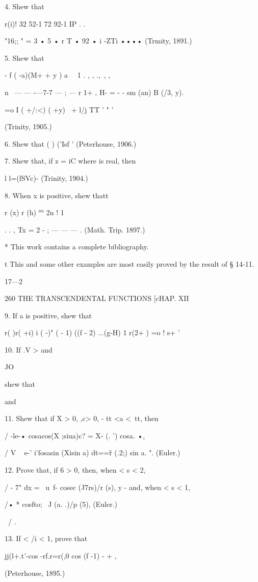 4. Shew that

 r(i)! 32 52-1 72 92-1 IP . .

"16;; " = 3 • 5 • r T • 92 • i -ZTi •••• (Trmity, 1891.)

5. Shew that

- f ( -a)(M+ + y ) a \ \ 1 . , , .,\ , ,

n \ — — -—7-7 — ; — r 1+ , H- = - - sm (an) B (/3, y).

 =o I ( +/:<) ( +y) \ + l/j TT ' " '

(Trinity, 1905.)

6. Shew that ( ) ('Isf ' (Peterhouse, 1906.)

7. Shew that, if z = iC where is real, then

l l=\/(fSVc)- (Trinity, 1904.)

8. When x is positive, shew thatt

r (x) r (h) °° 2n ! 1

 . . , Tx = 2 - ; — — — . (Math. Trip. 1897.)

* This work contains a complete bibliography.

t This and some other examples are most easily proved by the result of
§ 14-11.

17—2



260 THE TRANSCENDENTAL FUNCTIONS [cHAP. XII

9. If a is positive, shew that

r( )r( +i) i ( -)" ( - 1) ((f - 2) ...(g-H) 1 r(2+ ) =o ! s+ '

10. If .V > and

JO

shew that

and

11. Shew that if X > 0, ,c> 0, - tt <a <\ tt, then

/ -le-• cosacos(X ;siua)c? = X- (. ') cosa. •,

/ V ~ e-' i'fosasin (Xisin a) dt==\~ r (.2;) sin a. ". (Euler.)

12. Prove that, if 6 > 0, then, when < s < 2,

/ - 7" dx = \ u\ f- cosec (J7rs)/r (s), y - and, when < s < 1,

/• * cosfto; \ J (a. .)/p (5), (Euler.)

\ / .

13. If < /i < 1, prove that

jj(l+.t'-cos -rf.r=r(,0 cos (f -1) - + ,

(Peterhouse, 1895.)

